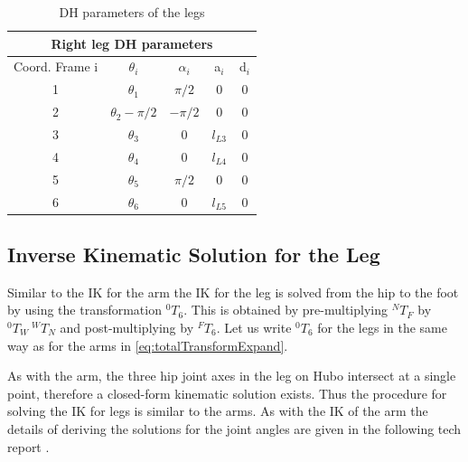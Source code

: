 \documentclass[letterpaper, 10 pt, conference]{IEEEtran}
\begin{document}
\begin{table}[h]
    \centering
     \caption{DH parameters of the legs}
    \begin{tabular}{|c|c|c|c|c|} \hline
    \multicolumn{5}{|c|}{Right leg DH parameters} \\ \hline
    Coord. Frame i &  $\theta_i$          & $\alpha_i$ & a$_i$ & d$_i$ \\ \hline
   	  1 &  $\theta_1$          & $\pi/2$    & 0     & 0\\ \hline
    	  2 &  $\theta_2 - \pi/2$  & $-\pi/2$   & 0     & 0 \\ \hline
   	  3 &  $\theta_3$          & 0          & $l_{L3}$ & 0 \\ \hline
   	  4 &  $\theta_4$          & 0          & $l_{L4}$ & 0 \\ \hline
    	  5 &  $\theta_5$          & $\pi/2$    & 0     & 0 \\ \hline
    	  6 &  $\theta_6$          & 0          & $l_{L5}$ & 0 \\ \hline
    \end{tabular} \label{tbl:legDH}
\end{table}

\subsection{Inverse Kinematic Solution for the Leg}
Similar to the IK for the arm the IK for the leg is solved from the hip to the foot by using the transformation $^0T_6$. This is obtained by pre-multiplying $^NT_F$ by $^0T_W\:^WT_N$ and post-multiplying by $^FT_6$. Let us write $^0T_6$ for the legs in the same way as for the arms in \eqref{eq:totalTransformExpand}.

As with the arm, the three hip joint axes in the leg on Hubo intersect at a single point, therefore a closed-form kinematic solution exists. Thus the procedure for solving the IK for legs is similar to the arms. As with the IK of the arm the details of deriving the solutions for the joint angles are given in the following tech report \cite{O'Flaherty:2013inverseIK}.
\end{document}
